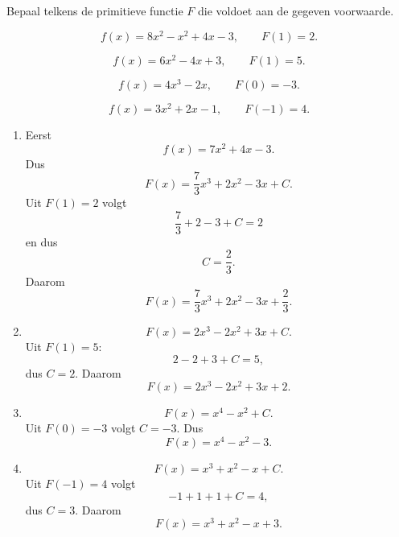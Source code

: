 \documentclass{ximera}
\begin{document}
\begin{oefening}{\oefB\ESS}

Bepaal telkens de primitieve functie $F$ die voldoet aan de gegeven voorwaarde.

\begin{question}
\[
f(x)=8x^2-x^2+4x-3,
\qquad
F(1)=2.
\]
\end{question}

\begin{question}
\[
f(x)=6x^2-4x+3,
\qquad
F(1)=5.
\]
\end{question}

\begin{question}
\[
f(x)=4x^3-2x,
\qquad
F(0)=-3.
\]
\end{question}

\begin{question}
\[
f(x)=3x^2+2x-1,
\qquad
F(-1)=4.
\]
\end{question}

\begin{oplossing}

\begin{enumerate}
\item Eerst
\[
f(x)=7x^2+4x-3.
\]
Dus
\[
F(x)=\frac73x^3+2x^2-3x+C.
\]
Uit $F(1)=2$ volgt
\[
\frac73+2-3+C=2
\]
en dus
\[
C=\frac23.
\]
Daarom
\[
\boxed{F(x)=\frac73x^3+2x^2-3x+\frac23}.
\]

\item
\[
F(x)=2x^3-2x^2+3x+C.
\]
Uit $F(1)=5$:
\[
2-2+3+C=5,
\]
dus $C=2$. Daarom
\[
\boxed{F(x)=2x^3-2x^2+3x+2}.
\]

\item
\[
F(x)=x^4-x^2+C.
\]
Uit $F(0)=-3$ volgt $C=-3$. Dus
\[
\boxed{F(x)=x^4-x^2-3}.
\]

\item
\[
F(x)=x^3+x^2-x+C.
\]
Uit $F(-1)=4$ volgt
\[
-1+1+1+C=4,
\]
dus $C=3$. Daarom
\[
\boxed{F(x)=x^3+x^2-x+3}.
\]
\end{enumerate}

\end{oplossing}

\end{oefening}


\end{document}
